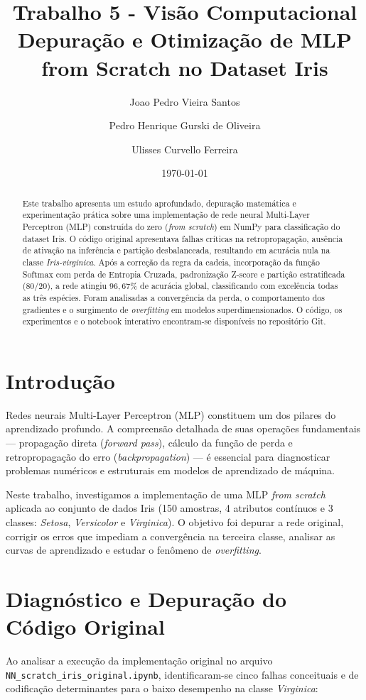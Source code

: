 \documentclass[twocolumn]{article}
\title{Trabalho 5 - Visão Computacional \\ \large Depuração e Otimização de MLP from Scratch no Dataset Iris}
\author{Joao Pedro Vieira Santos \and Pedro Henrique Gurski de Oliveira \and Ulisses Curvello Ferreira}
\date{\today}
\begin{document}
\maketitle

\begin{abstract}
Este trabalho apresenta um estudo aprofundado, depuração matemática e experimentação prática sobre uma implementação de rede neural Multi-Layer Perceptron (MLP) construída do zero (\textit{from scratch}) em NumPy para classificação do dataset Iris. O código original apresentava falhas críticas na retropropagação, ausência de ativação na inferência e partição desbalanceada, resultando em acurácia nula na classe \textit{Iris-virginica}. Após a correção da regra da cadeia, incorporação da função Softmax com perda de Entropia Cruzada, padronização Z-score e partição estratificada (80/20), a rede atingiu $96{,}67\%$ de acurácia global, classificando com excelência todas as três espécies. Foram analisadas a convergência da perda, o comportamento dos gradientes e o surgimento de \textit{overfitting} em modelos superdimensionados. O código, os experimentos e o notebook interativo encontram-se disponíveis no repositório Git.
\end{abstract}

\section{Introdução}
Redes neurais Multi-Layer Perceptron (MLP) constituem um dos pilares do aprendizado profundo. A compreensão detalhada de suas operações fundamentais --- propagação direta (\textit{forward pass}), cálculo da função de perda e retropropagação do erro (\textit{backpropagation}) --- é essencial para diagnosticar problemas numéricos e estruturais em modelos de aprendizado de máquina.

Neste trabalho, investigamos a implementação de uma MLP \textit{from scratch} aplicada ao conjunto de dados Iris (150 amostras, 4 atributos contínuos e 3 classes: \textit{Setosa}, \textit{Versicolor} e \textit{Virginica}). O objetivo foi depurar a rede original, corrigir os erros que impediam a convergência na terceira classe, analisar as curvas de aprendizado e estudar o fenômeno de \textit{overfitting}.

\section{Diagnóstico e Depuração do Código Original}
Ao analisar a execução da implementação original no arquivo \texttt{NN\_scratch\_iris\_original.ipynb}, identificaram-se cinco falhas conceituais e de codificação determinantes para o baixo desempenho na classe \textit{Virginica}:
\end{document}
